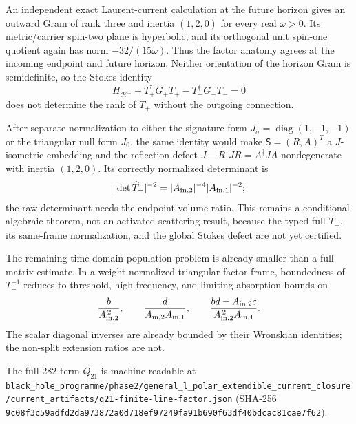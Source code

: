 \documentclass[11pt]{article}
\newcommand{\cert}[1]{\nolinkurl{#1}}
\begin{document}
An independent exact Laurent-current calculation at the future horizon
gives an outward Gram of rank three and inertia \((1,2,0)\) for every real
\(\omega>0\).  Its metric/carrier spin-two plane is hyperbolic, and its orthogonal
unit spin-one quotient again has norm \(-32/(15\omega)\).  Thus the factor
anatomy agrees at the incoming endpoint and future horizon.  Neither
orientation of the horizon Gram is semidefinite, so the Stokes identity
\[
 H_{\mathcal H^+}+T_+^\dagger G_+T_+
 -T_-^\dagger G_-T_-=0
\]
does not determine the rank of \(T_+\) without the outgoing connection.

After separate normalization to either the signature form
\(J_\sigma=\operatorname{diag}(1,-1,-1)\) or the triangular null form
\(J_0\), the same identity would make
\(\mathsf S=(R,A)^T\) a \(J\)-isometric embedding and the reflection defect
\(J-R^\dagger JR=A^\dagger JA\) nondegenerate with inertia \((1,2,0)\).
Its correctly normalized determinant is
\[
 |\det\widehat T_-|^{-2}
 =|A_{{\rm in},2}|^{-4}|A_{{\rm in},1}|^{-2};
\]
the raw determinant needs the endpoint volume ratio.  This remains a
conditional algebraic theorem, not an activated scattering result, because
the typed full \(T_+\), its same-frame normalization, and the global Stokes
defect are not yet certified.

The remaining time-domain population problem is already smaller than a
full matrix estimate.  In a weight-normalized triangular factor frame,
boundedness of \(T_-^{-1}\) reduces to threshold, high-frequency, and
limiting-absorption bounds on
\[
 \frac{b}{A_{{\rm in},2}^{\,2}},\qquad
 \frac{d}{A_{{\rm in},2}A_{{\rm in},1}},\qquad
 \frac{bd-A_{{\rm in},2}c}
 {A_{{\rm in},2}^{\,2}A_{{\rm in},1}}.
\]
The scalar diagonal inverses are already bounded by their Wronskian
identities; the non-split extension ratios are not.

The full 282-term $Q_{21}$ is machine readable at
\cert{black_hole_programme/phase2/general_l_polar_extendible_current_closure/current_artifacts/q21-finite-line-factor.json}
(SHA-256
\cert{9c08f3c59adfd2da973872a0d718ef97249fa91b690f63df40bdcac81cae7f62}).
\end{document}
